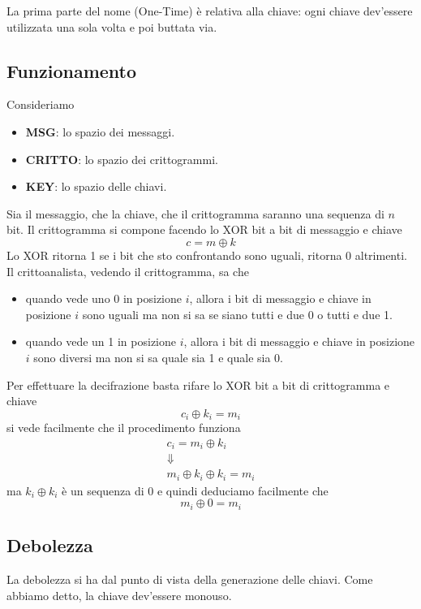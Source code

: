 La prima parte del nome (One-Time) \`e relativa alla chiave: ogni chiave dev'essere utilizzata una sola volta e poi
buttata via.

\subsection{Funzionamento}\label{funzionamento_otp}
Consideriamo
\begin{itemize}
	\item \textbf{MSG}: lo spazio dei messaggi.
	\item \textbf{CRITTO}: lo spazio dei crittogrammi.
	\item \textbf{KEY}: lo spazio delle chiavi.
\end{itemize}
Sia il messaggio, che la chiave, che il crittogramma saranno una sequenza di $n$ bit. Il crittogramma si compone facendo
lo XOR bit a bit di messaggio e chiave
\[ c = m \oplus k \]
Lo XOR ritorna 1 se i bit che sto confrontando sono uguali, ritorna 0 altrimenti. Il crittoanalista, vedendo il
crittogramma, sa che
\begin{itemize}
	\item quando vede uno 0 in posizione $i$, allora i bit di messaggio e chiave in posizione $i$ sono uguali ma
	      non si sa se siano tutti e due 0 o tutti e due 1.
	\item quando vede un 1 in posizione $i$, allora i bit di messaggio e chiave in posizione $i$ sono diversi ma
	      non si sa quale sia 1 e quale sia 0.
\end{itemize}
Per effettuare la decifrazione basta rifare lo XOR bit a bit di crittogramma e chiave
\[ c_i \oplus k_i = m_i \]
si vede facilmente che il procedimento funziona
\begin{gather*}
	c_i = m_i \oplus k_i \\
	\Downarrow \\
	m_i \oplus k_i \oplus k_i = m_i
\end{gather*}
ma $k_i \oplus k_i$ \`e un sequenza di 0 e quindi deduciamo facilmente che
\[ m_i \oplus 0 = m_i \]

\subsection{Debolezza}\label{debolezza_otp}
La debolezza si ha dal punto di vista della generazione delle chiavi. Come abbiamo detto, la chiave dev'essere monouso.

